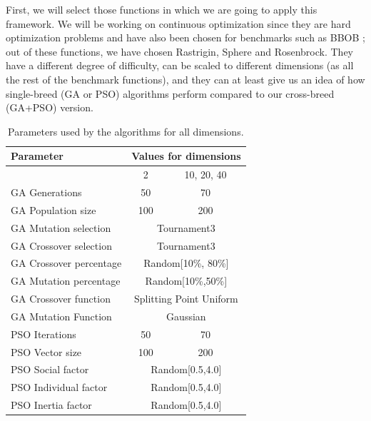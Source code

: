 \documentclass[runningheads]{llncs}
\begin{document}
First, we will select those functions in which we are going to apply this framework. We
will be working on continuous optimization since they are hard optimization
problems and have also been chosen for benchmarks such as BBOB
\cite{hansen2010bbob}; out of these functions, we have chosen Rastrigin, Sphere
and Rosenbrock. They have a
different degree of difficulty, can be scaled to different dimensions (as all
the rest of the benchmark functions), and they can at least give us an idea of
how single-breed (GA or PSO) algorithms perform compared to our cross-breed
(GA+PSO) version.  

   \begin{table}[h!tp]
    \caption{Parameters used by the algorithms for all dimensions.}
    \label{table:ga-pso-parameters}
    \centering
    \begin{tabular}{|l|c|c|}
    \hline
    Parameter & \multicolumn{2}{c|}{Values for dimensions} \\
      \hline
      & 2 & 10, 20, 40 \\
    \hline
    GA Generations & 50 &  70\\
    \hline
     GA Population size & 100 & 200\\
    \hline
    GA Mutation selection &  \multicolumn{2}{c|}{Tournament3}\\
    \hline
    GA Crossover selection & \multicolumn{2}{c|}{Tournament3} \\
    \hline
    GA Crossover percentage & \multicolumn{2}{c|}{Random[10\%, 80\%]} \\
    \hline
    GA Mutation percentage & \multicolumn{2}{c|}{Random[10\%,50\%]} \\
    \hline
    GA Crossover function & \multicolumn{2}{c|}{Splitting Point Uniform} \\
    \hline
    GA Mutation Function & \multicolumn{2}{c|}{Gaussian} \\
      \hline 
      \hline
    PSO Iterations & 50 & 70\\
    \hline
    PSO Vector size & 100 & 200\\
    \hline
    PSO Social factor & \multicolumn{2}{c|}{Random[0.5,4.0]} \\
    \hline
    PSO Individual factor & \multicolumn{2}{c|}{Random[0.5,4.0]} \\
    \hline
    PSO Inertia factor & \multicolumn{2}{c|}{Random[0.5,4.0]} \\
    \hline
    \end{tabular}
\end{table}
\end{document}
